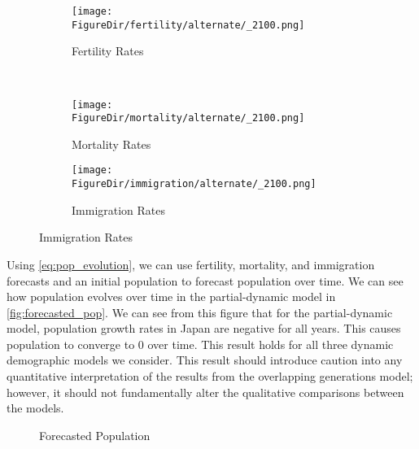 \documentclass[10pt]{article}
\renewcommand{\thesection}{\arabic{section}}
\renewcommand{\thesubsection}{\thesection.\arabic{subsection}}
\renewcommand{\thesubsubsection}{\thesubsection.\arabic{subsubsection}}
\renewcommand{\subsubsection}[2][]{\oldsubsubsection[#1]{#2}\index{#1}\label{sec:\thesubsubsection}}
\numberwithin{equation}{subsection}
\newcommand*{\FigureDir}{../../graphs}
\begin{document}
\begin{figure}[!ht]
   \caption{\label{fig:alt_demog}Demographics Forecasted by Non-Parametric Model}
   \begin{subfigure}{0.5\textwidth}
      \centering
      \texttt{[image: \\FigureDir/fertility/alternate/\_2100.png]}
      \caption{Fertility Rates}
   \end{subfigure}%
   ~ %
   \begin{subfigure}{0.5\textwidth}
      \centering
      \texttt{[image: \\FigureDir/mortality/alternate/\_2100.png]}
      \caption{Mortality Rates}
   \end{subfigure}
   \newline
   \begin{subfigure}{0.5\textwidth}
      \centering
      \texttt{[image: \\FigureDir/immigration/alternate/\_2100.png]}
      \caption{Immigration Rates}
   \end{subfigure}
\end{figure}


\subsubsection{Population Forecasts}

\par Using \ref{eq:pop_evolution}, we can use fertility, mortality, and immigration forecasts and an initial population to forecast population over time. We can see how population evolves over time in the partial-dynamic model in \autoref{fig:forecasted_pop}. We can see from this figure that for the partial-dynamic model, population growth rates in Japan are negative for all years. This causes population to converge to 0 over time. This result holds for all three dynamic demographic models we consider. This result should introduce caution into any quantitative interpretation of the results from the overlapping generations model; however, it should not fundamentally alter the qualitative comparisons between the models.

\begin{figure}[!ht]
   \centering
   \caption{\label{fig:forecasted_pop}Forecasted Population}
\end{figure}
\end{document}
